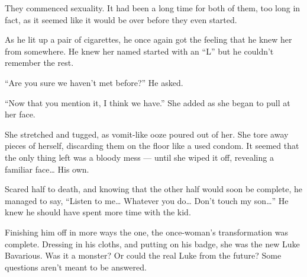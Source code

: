 They commenced sexuality. It had been a long time for both of them,
too long in fact, as it seemed like it would be over before they
even started.



As he lit up a pair of cigarettes, he once again got the feeling
that he knew her from somewhere. He knew her named started with an
``L'' but he couldn't remember the rest.



``Are you sure we haven't met before?'' He
asked.



``Now that you mention it, I think we have.'' She added
as she began to pull at her face.



She stretched and tugged, as vomit-like ooze poured out of her. She
tore away pieces of herself, discarding them on the floor like a
used condom. It seemed that the only thing left was a bloody mess
--- until she wiped it off, revealing a familiar face{\ldots}
His own.



Scared half to death, and knowing that the other half would soon be
complete, he managed to say, ``Listen to me{\ldots} Whatever
you do{\ldots} Don't touch my son{\ldots}'' He knew he
should have spent more time with the kid.



Finishing him off in more ways the one, the once-woman's
transformation was complete. Dressing in his cloths, and putting on
his badge, she was the new Luke Bavarious. Was it a monster? Or
could the real Luke from the future? Some questions aren't
meant to be answered. 
 






